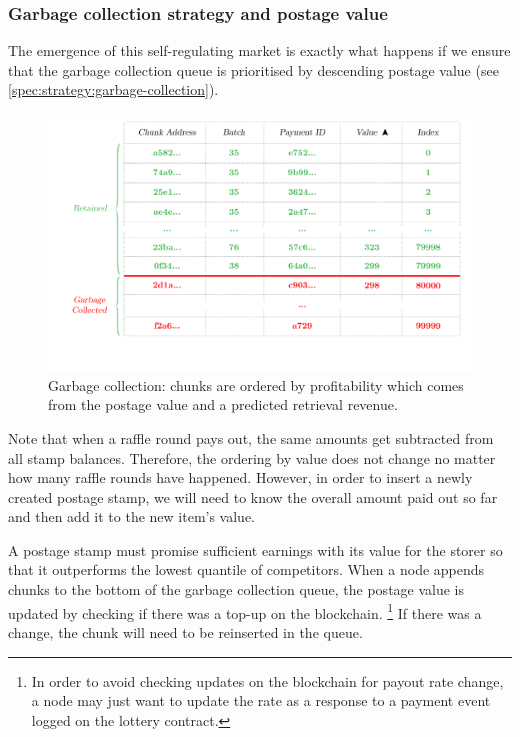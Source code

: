 \subsubsection{Garbage collection strategy and postage value}

The emergence of this self-regulating market is exactly what happens if we ensure that the garbage collection queue is prioritised by descending postage value (see \ref{spec:strategy:garbage-collection}).

\begin{figure}[htbp]
  \centering
  \includegraphics[width=\textwidth]{fig/garbage-collection-fixed.pdf}
  \caption[Garbage collection \statusgreen]{Garbage collection: chunks are ordered by profitability which comes from the postage value and a predicted retrieval revenue.}
  \label{fig:garbage-collection}
\end{figure}


Note that when a raffle round pays out, the same amounts get subtracted from all stamp balances. Therefore, the ordering by value does not change no matter how many raffle rounds have happened. However, in order to insert a newly created postage stamp, we will need to know the overall amount paid out so far and then add it to the new item's value.

A postage stamp must promise sufficient earnings with its value for the storer so that it outperforms the lowest quantile of competitors. When a node appends chunks to the bottom of the garbage collection queue, the postage value is updated by checking if there was a top-up on the blockchain.%
%
\footnote{In order to avoid checking updates on the blockchain for payout rate change, a node may just want to update the rate as a response to a payment event logged on the lottery contract.}
%
If there was a change, the chunk will need to be reinserted in the queue. 

